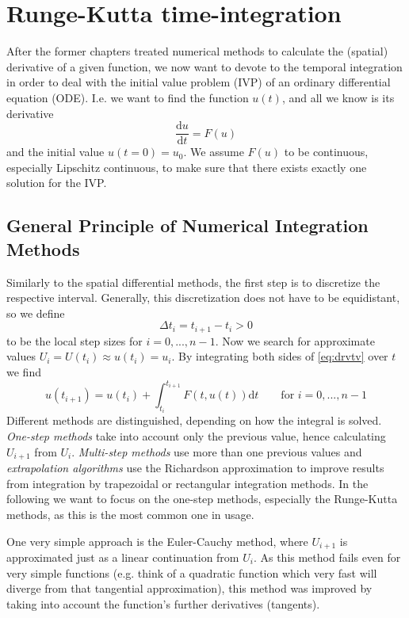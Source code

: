 \section{Runge-Kutta time-integration}

After the former chapters treated numerical methods to calculate the (spatial) derivative of a given function, we now want to devote to the temporal integration in order to deal with the initial value problem (IVP) of an ordinary differential equation (ODE). I.e. we want to find the function $u(t)$, and all we know is its derivative
\begin{equation}
  \frac{\mathrm{d} u}{\mathrm{d} t} = F(u)
  \label{eq:drvtv}
\end{equation}
and the initial value $u(t = 0) = u_0$.
We assume $F(u)$ to be continuous, especially Lipschitz continuous, to make sure that there exists exactly one solution for the IVP.

\subsection{General Principle of Numerical Integration Methods}
Similarly to the spatial differential methods, the first step is to discretize the respective interval. Generally, this discretization does not have to be equidistant, so we define
\begin{equation}
  \Delta t_i = t_{i+1} - t_i >0
\end{equation}
to be the local step sizes for $i = 0,..., n-1$.
Now we search for approximate values $U_i = U(t_i) \approx u(t_i) = u_i$.
By integrating both sides of \ref{eq:drvtv} over $t$ we find
\begin{equation}
  u(t_{i+1}) = u(t_i) + \int_{t_i}^{t_{i+1}} F(t,u(t)) \mathrm{d}t \qquad \text{for } i = 0,...,n-1
\end{equation}
Different methods are distinguished, depending on how the integral is solved. \emph{One-step methods} take into account only the previous value, hence calculating $U_{i+1}$ from $U_i$. \emph{Multi-step methods} use more than one previous values and \emph{extrapolation algorithms} use the Richardson approximation to improve results from integration by trapezoidal or rectangular integration methods.
In the following we want to focus on the one-step methods, especially the Runge-Kutta methods, as this is the most common one in usage.

One very simple approach is the Euler-Cauchy method, where $U_{i+1}$ is approximated just as a linear continuation from $U_i$. As this method fails even for very simple functions (e.g. think of a quadratic function which very fast will diverge from that tangential approximation), this method was improved by taking into account the function's further derivatives (tangents).

